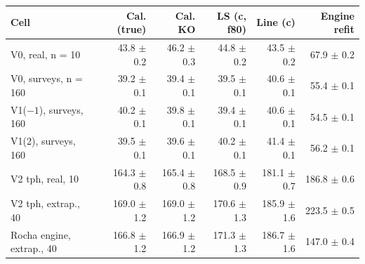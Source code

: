 \begin{tabular}{@{}lrrrrr@{}}
\toprule
Cell & Cal. (true) & Cal. KO & LS (c, f80) & Line (c) & Engine refit \\
\midrule
V0, real, n = 10 & 43.8 $\pm$ 0.2 & 46.2 $\pm$ 0.3 & 44.8 $\pm$ 0.2 & 43.5 $\pm$ 0.2 & 67.9 $\pm$ 0.2 \\
V0, surveys, n = 160 & 39.2 $\pm$ 0.1 & 39.4 $\pm$ 0.1 & 39.5 $\pm$ 0.1 & 40.6 $\pm$ 0.1 & 55.4 $\pm$ 0.1 \\
V1($-1$), surveys, 160 & 40.2 $\pm$ 0.1 & 39.8 $\pm$ 0.1 & 39.4 $\pm$ 0.1 & 40.6 $\pm$ 0.1 & 54.5 $\pm$ 0.1 \\
V1(2), surveys, 160 & 39.5 $\pm$ 0.1 & 39.6 $\pm$ 0.1 & 40.2 $\pm$ 0.1 & 41.4 $\pm$ 0.1 & 56.2 $\pm$ 0.1 \\
V2 tph, real, 10 & 164.3 $\pm$ 0.8 & 165.4 $\pm$ 0.8 & 168.5 $\pm$ 0.9 & 181.1 $\pm$ 0.7 & 186.8 $\pm$ 0.6 \\
V2 tph, extrap., 40 & 169.0 $\pm$ 1.2 & 169.0 $\pm$ 1.2 & 170.6 $\pm$ 1.3 & 185.9 $\pm$ 1.6 & 223.5 $\pm$ 0.5 \\
Rocha engine, extrap., 40 & 166.8 $\pm$ 1.2 & 166.9 $\pm$ 1.2 & 171.3 $\pm$ 1.3 & 186.7 $\pm$ 1.6 & 147.0 $\pm$ 0.4 \\
\bottomrule
\end{tabular}
